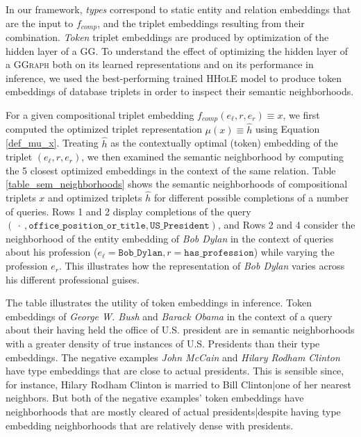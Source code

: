 \documentclass[a4paper,10pt]{article}
\begin{document}
In our framework, \emph{types} correspond to static entity and relation embeddings that are the input to $f_{comp}$, and the triplet embeddings resulting from their combination. \emph{Token} triplet embeddings are produced by optimization of the hidden layer of a \textsc{GG}. 
To understand the effect of optimizing the hidden layer of a \textsc{GGraph} both on its learned representations and on its performance in inference, we used the best-performing trained \textsc{HHolE} model to produce token embeddings of database triplets in order to inspect their semantic neighborhoods. 

For a given compositional triplet embedding $f_{comp}(e_\ell, r, e_r)\equiv x$, we first computed the optimized triplet representation $\mu(x) \equiv \hat{h} $ using Equation \ref{def_mu_x}. Treating $\hat{h}$ as the contextually optimal (token) embedding of the triplet $(e_\ell, r, e_r)$, we then examined the semantic neighborhood by computing the 5 closest optimized embeddings in the context of the same relation. Table \ref{table_sem_neighborhoods} shows the semantic neighborhoods of compositional triplets $x$ and optimized triplets $\hat{h}$ for different possible completions of a number of queries. Rows 1 and 2 display completions of the query $( \ \cdot\ , \mathtt{office\_{}position\_{}or\_{}title}, \mathtt{US\_{}President})$, and Rows 2 and 4 consider the neighborhood of the entity embedding of \emph{Bob Dylan} in the context of queries about his profession ($e_\ell = \mathtt{Bob\_{}Dylan}, r  = \mathtt{has\_{}profession}$) while varying the profession $e_r$. This illustrates how the representation of \emph{Bob Dylan} varies across his different professional guises. 

The table illustrates the utility of token embeddings in inference. Token embeddings of \emph{George W. Bush} and \emph{Barack Obama} in the context of a query about their having held the office of U.S. president are in semantic neighborhoods with a greater density of true instances of U.S. Presidents than their type embeddings. The negative examples \emph{John McCain} and \emph{Hilary Rodham Clinton} have type embeddings that are close to actual presidents. This is sensible since, for instance, Hilary Rodham Clinton is married to Bill Clinton|one of her nearest neighbors. But both of the negative examples' token embeddings have neighborhoods that are mostly cleared of actual presidents|despite having type embedding neighborhoods that are relatively dense with presidents. 
\end{document}

